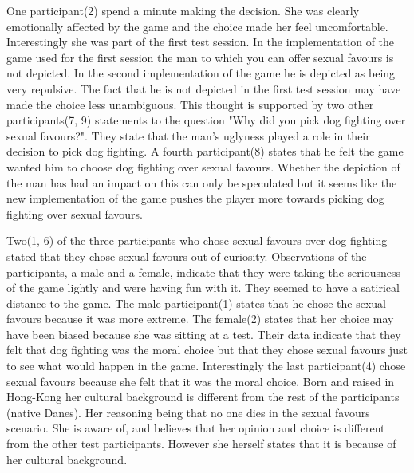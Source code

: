 One participant(2) spend a minute making the decision. She was clearly emotionally affected by the game and the choice made her feel uncomfortable. Interestingly she was part of the first test session. In the implementation of the game used for the first session the man to which you can offer sexual favours is not depicted. In the second implementation of the game he is depicted as being very repulsive.   The fact that he is not depicted in the first test session may have made the choice less unambiguous. This thought is supported by two other participants(7, 9) statements to the question "Why did you pick dog fighting over sexual favours?". They state that the man's uglyness played a role in their decision to pick dog fighting. A fourth participant(8) states that he felt the game wanted him to choose dog fighting over sexual favours. Whether the depiction of the man has had an impact on this can only be speculated but it seems like the new implementation of the game pushes the player more towards picking dog fighting over sexual favours.

Two(1, 6) of the three participants who chose sexual favours over dog fighting stated that they chose sexual favours out of curiosity. Observations of the participants, a male and a female, indicate that they were taking the seriousness of the game lightly and were having fun with it. They seemed to have a satirical distance to the game. The male participant(1) states that he chose the sexual favours because it was more extreme. The female(2) states that her choice may have been biased because she was sitting at a test. Their data indicate that they felt that dog fighting was the moral choice but that they chose sexual favours just to see what would happen in the game. Interestingly the last participant(4) chose sexual favours because she felt that it was the moral choice. Born and raised in Hong-Kong her cultural background is different from the rest of the participants (native Danes). Her reasoning being that no one dies in the sexual favours scenario. She is aware of, and believes that her opinion and choice is different from the other test participants. However she herself states that it is because of her cultural background.

